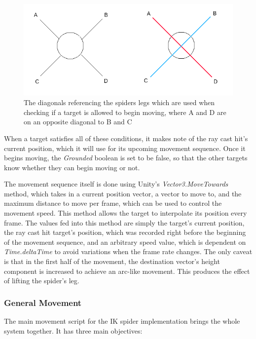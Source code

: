 \begin{figure}
    \centering
    \captionsetup{justification=centering}
    \includegraphics[width=\textwidth]{grafika/diagonals.png}
    \caption{The diagonals referencing the spiders legs which are used when
    checking if a target is allowed to begin moving, where A and D are on an
opposite diagonal to B and C}
    \label{fig:diagonals}
\end{figure}

When a target satisfies all of these conditions, it makes note of the ray cast
hit's current position, which it will use for its upcoming movement sequence.
Once it begins moving, the \textit{Grounded} boolean is set to be false, so that
the other targets know whether they can begin moving or not.

The movement sequence itself is done using Unity's \textit{Vector3.MoveTowards}
method, which takes in a current position vector, a vector to move to, and the
maximum distance to move per frame, which can be used to control the movement
speed. This method allows the target to interpolate its position every frame.
The values fed into this method are simply the target's current position, the
ray cast hit target's position, which was recorded right before the beginning of
the movement sequence, and an arbitrary speed value, which is dependent on
\textit{Time.deltaTime} to avoid variations when the frame rate changes. The
only caveat is that in the first half of the movement, the destination vector's
height component is increased to achieve an arc-like movement. This produces the
effect of lifting the spider's leg.

\subsubsection{General Movement}
The main movement script for the IK spider implementation brings the whole
system together. It has three main objectives:

